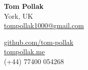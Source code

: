 \documentclass{structure} %
\begin{document}

\parbox{0.5\textwidth}{ %
{\namesize\bf{Tom Pollak}} \\[6pt]
York, UK\\ %
\href{mailto:tompollak1000@gmail.com}{tompollak1000@gmail.com}}  %
\hfill %
\parbox{0.5\textwidth}{ %
\vspace*{10pt}


\begin{flushright}
    
\href{https://github.com/tom-pollak}{github.com/tom-pollak} \\ %
\href{https://tompollak.me}{tompollak.me} \\  %
(+44) 77400 054268 %
\end{flushright}

}
\end{document}
